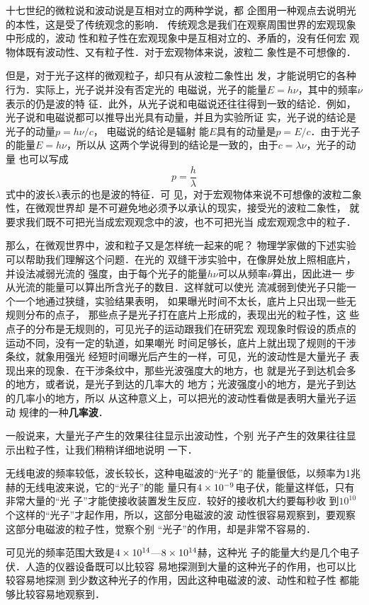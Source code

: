十七世纪的微粒说和波动说是互相对立的两种学说，都
企图用一种观点去说明光的本性，这是受了传统观念的影响．
传统观念是我们在观察周围世界的宏观现象中形成的，波动
性和粒子性在宏观现象中是互相对立的、矛盾的，没有任何宏
观物体既有波动性、又有粒子性．对于宏观物体来说，波粒二
象性是不可想像的．

但是，对于光子这样的微观粒子，却只有从波粒二象性出
发，才能说明它的各种行为．实际上，光子说并没有否定光的
电磁说，光子的能量$E=h\nu$，其中的频率$\nu$表示的仍是波的特
征．此外，从光子说和电磁说还往往得到一致的结论．例如，
光子说和电磁说都可以推导出光具有动量，并且为实验所证
实，光子说的结论是光子的动量$p=h\nu/c$，
电磁说的结论是辐射
能$E$具有的动量是$p=E/c$．由于光子的能量$E=h\nu$，所以从
这两个学说得到的结论是一致的，由于$c=\lambda\nu$，光子的动量
也可以写成
$$p=\frac{h}{\lambda}$$
式中的波长$\lambda$表示的也是波的特征．可
见，对于宏观物体来说不可想像的波粒二象性，在微观世界却
是不可避免地必须予以承认的现实，接受光的波粒二象性，
就要求我们既不可把光当成宏观观念中的波，也不可把光当
成宏观观念中的粒子．

那么，在微观世界中，波和粒子又是怎样统一起来的呢？
物理学家做的下述实验可以帮助我们理解这个问题．在光的
双缝干涉实验中，在像屏处放上照相底片，并设法减弱光流的
强度，由于每个光子的能量$h\nu$可以从频率$\nu$算出，因此进一
步从光流的能量可以算出所含光子的数目．这样就可以使光
流减弱到使光子只能一个一个地通过狭缝，实验结果表明，
如果曝光时间不太长，底片上只出现一些无规则分布的点子，
那些点子是光子打在底片上形成的，表现出光的粒子性，这
些点子的分布是无规则的，可见光子的运动跟我们在研究宏
观现象时假设的质点的运动不同，没有一定的轨道，如果嘲光
时间足够长，底片上就出现了规则的干涉条纹，就象用强光
经短时间曝光后产生的一样，可见，光的波动性是大量光子
表现出来的现象．在干涉条纹中，那些光波强度大的地方，也
就是光子到达机会多的地方，或者说，是光子到达的几率大的
地方；光波强度小的地方，是光子到达的几率小的地方，所以
从这种意义上，可以把光的波动性看做是表明大量光子运动
规律的一种\textbf{几率波}．

一般说来，大量光子产生的效果往往显示出波动性，个别
光子产生的效果往往显示出粒子性，让我们稍稍详细地说明
一下．

无线电波的频率较低，波长较长，这种电磁波的“光子”的
能量很低，以频率为1兆赫的无线电波来说，它的“光子”的能
量只有$4\times10^{-9}$电子伏，能量这样低，只有非常大量的“光
子”才能使接收装置发生反应．较好的接收机大约要每秒收
到$10^{10}$个这样的“光子”才起作用，所以，这部分电磁波的波
动性很容易观察到，要观察这部分电磁波的粒子性，觉察个别
“光子”的作用，却是非常不容易的．

可见光的频率范围大致是$4\times10^{14}$—$8\times10^{14}$赫，这种光
子的能量大约是几个电子伏．人造的仪器设备既可以比较容
易地探测到大量的这种光子的作用，也可以比较容易地探测
到少数这种光子的作用，因此这种电磁波的波、动性和粒子性
都能够比较容易地观察到．

